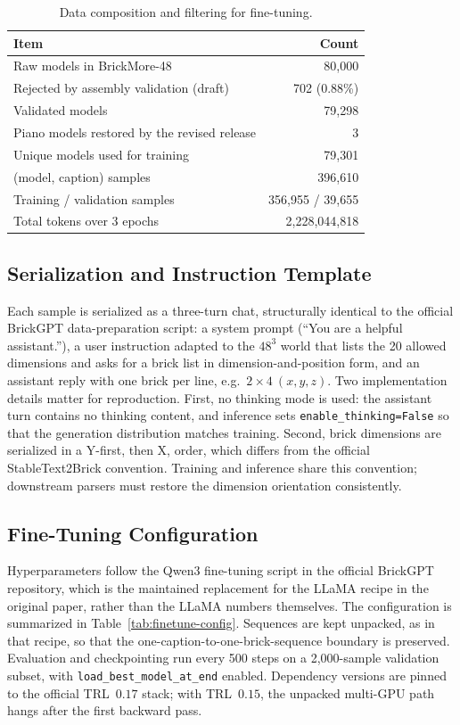 \documentclass[10pt,twocolumn,letterpaper]{article}
\begin{document}
\begin{table}[t]
\centering
\small
\setlength{\tabcolsep}{4pt}
\begin{tabular}{lr}
\toprule
Item & Count \\
\midrule
Raw models in BrickMore-48 & 80,000 \\
Rejected by assembly validation (draft) & 702 (0.88\%) \\
Validated models & 79,298 \\
Piano models restored by the revised release & 3 \\
Unique models used for training & 79,301 \\
(model, caption) samples & 396,610 \\
Training / validation samples & 356,955 / 39,655 \\
Total tokens over 3 epochs & 2,228,044,818 \\
\bottomrule
\end{tabular}
\caption{Data composition and filtering for fine-tuning.}
\label{tab:training-data}
\end{table}

\subsection{Serialization and Instruction Template}
Each sample is serialized as a three-turn chat, structurally identical to the official BrickGPT data-preparation script: a system prompt (``You are a helpful assistant.''), a user instruction adapted to the $48^3$ world that lists the 20 allowed dimensions and asks for a brick list in dimension-and-position form, and an assistant reply with one brick per line, e.g.\ $2{\times}4\ (x,y,z)$. Two implementation details matter for reproduction. First, no thinking mode is used: the assistant turn contains no thinking content, and inference sets \texttt{enable\_thinking=False} so that the generation distribution matches training. Second, brick dimensions are serialized in a Y-first, then X, order, which differs from the official StableText2Brick convention. Training and inference share this convention; downstream parsers must restore the dimension orientation consistently.

\subsection{Fine-Tuning Configuration}
Hyperparameters follow the Qwen3 fine-tuning script in the official BrickGPT repository, which is the maintained replacement for the LLaMA recipe in the original paper, rather than the LLaMA numbers themselves. The configuration is summarized in Table~\ref{tab:finetune-config}. Sequences are kept unpacked, as in that recipe, so that the one-caption-to-one-brick-sequence boundary is preserved. Evaluation and checkpointing run every 500 steps on a 2,000-sample validation subset, with \texttt{load\_best\_model\_at\_end} enabled. Dependency versions are pinned to the official TRL~$0.17$ stack; with TRL~$0.15$, the unpacked multi-GPU path hangs after the first backward pass.
\end{document}
